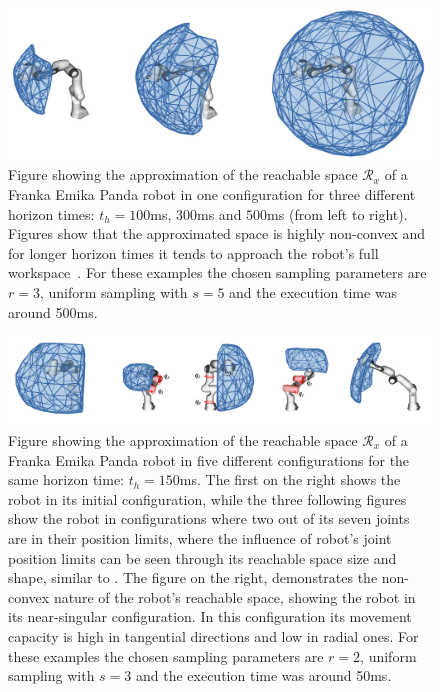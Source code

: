 \begin{figure}[!h]
    \centering
    \includegraphics[width=\textwidth]{Papers/images/horizon_nonlinear.png}
    \caption{Figure showing the approximation of the reachable space $\mathcal{R}_x$ of a Franka Emika Panda robot in one configuration for three different horizon times: $t_h=100$ms, $300$ms and $500$ms (from left to right). Figures show that the approximated space is highly non-convex and for longer horizon times it tends to approach the robot's full workspace~\cite{franka_maual}.  For these examples the chosen sampling parameters are $r=3$, uniform sampling with $s=5$ and the execution time was around 500ms.}
    \label{fig:curved_space_algo_new_real_panda}
\end{figure}

\begin{figure}[!h]
    \centering
    \includegraphics[width=\textwidth]{Papers/images/some_poses_robot_curved.png}
    \caption{Figure showing the approximation of the reachable space $\mathcal{R}_x$ of a Franka Emika Panda robot in five different configurations for the same horizon time: $t_h=150$ms. The first on the right shows the robot in its initial configuration, while the three following figures show the robot in configurations where two out of its seven joints are in their position limits, where the influence of robot's joint position limits can be seen through its reachable space size and shape, similar to . The figure on the right, demonstrates the non-convex nature of the robot's reachable space, showing the robot in its near-singular configuration. In this configuration its movement capacity is high in tangential directions and low in radial ones. For these examples the chosen sampling parameters are $r=2$, uniform sampling with $s=3$ and the execution time was around 50ms.}
    \label{fig:curved_space_algo_new_real_panda_curved}
\end{figure}


